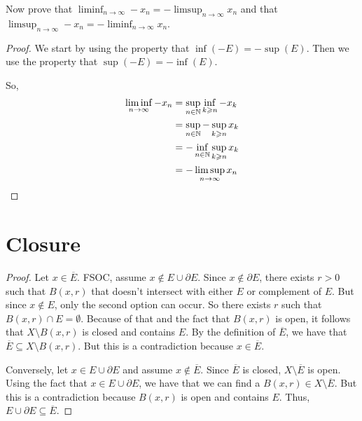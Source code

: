 \documentclass{report}
\begin{document}
\noindent Now prove that $\liminf_{n \to \infty} -x_n = -\limsup_{n \to \infty} x_n$ and that $\limsup_{n \to \infty} -x_n = -\liminf_{n \to \infty} x_n$.
\begin{proof}
    We start by using the property that $\inf(-E) = -\sup(E)$. Then we use the property that $\sup(-E) = -\inf(E)$.

    So, \begin{align*}
        \liminf_{n \to \infty} -x_n &= \sup_{n \in \NN}\inf_{k \geq n} -x_k \\
        &= \sup_{n \in \NN} -\sup_{k \geq n} x_k \\
        &= -\inf_{n \in \NN}\sup_{k \geq n} x_k \\
        &= -\limsup_{n \to \infty} x_n
    \end{align*}
\end{proof}
\newpage
\section{Closure}
\begin{proof}
    Let $x \in \overline{E}$. FSOC, assume $x \notin E \cup \partial E$. Since $x \notin \partial E$, there exists $r > 0$ such that $B(x, r)$ that doesn't intersect with either $E$ or complement of $E$. But since $x\notin E$, only the second option can occur. So there exists $r$ such that $B(x, r) \cap E = \emptyset$. Because of that and the fact that $B(x, r)$ is open, it follows that $X \setminus B(x, r)$ is closed and contains $E$. By the definition of $\overline{E}$, we have that $\overline{E} \subseteq X \setminus B(x, r)$. But this is a contradiction because $x \in \overline{E}$. 

    Conversely, let $x \in E \cup \partial E$ and assume $x \notin \overline{E}$. Since $\overline{E}$ is closed, $X \setminus \overline{E}$ is open. Using the fact that $x \in E \cup \partial E$, we have that we can find a $B(x, r) \in X \setminus \overline{E}$. But this is a contradiction because $B(x, r)$ is open and contains $E$. Thus, $E \cup \partial E \subseteq \overline{E}$.
\end{proof}
\end{document}
